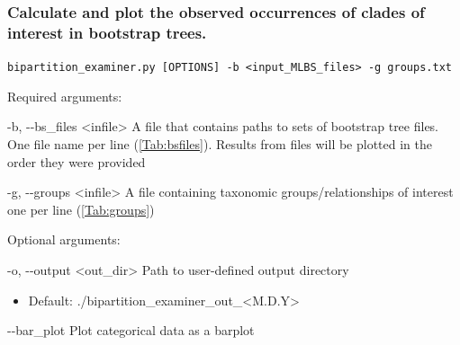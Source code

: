 \documentclass{article}
\def\code#1{\texttt{#1}}
\begin{document}
        \subsubsection{Calculate and plot the observed occurrences of clades of interest in bootstrap trees.}
        \begin{description}
            

            \vspace{0.2cm}
            \item \code{bipartition\_examiner.py [OPTIONS] -b <input\_MLBS\_files> -g groups.txt}
            \vspace{0.2cm}
            
            \begin{description}
                \item Required arguments:
                \begin{description}
                    \item -b, -\/-bs\_files \hspace{0.2cm} <infile> \hspace{0.2cm} A file that contains paths to sets of bootstrap tree files. One file name per line (\autoref{Tab:bsfiles}). Results from files will be plotted in the order they were provided
                    \item -g, -\/-groups \hspace{0.2cm} <infile> \hspace{0.2cm} A file containing taxonomic groups/relationships of interest one per line (\autoref{Tab:groups})
                \end{description}
            \end{description}
            \vspace{0.2cm}
            \begin{description}
                \item Optional arguments:
                \begin{description}
                    \item -o, -\/-output \hspace{0.2cm} <out\_dir> \hspace{0.2cm} Path to user-defined output directory
                    \begin{itemize}
                        \item Default: ./bipartition\_examiner\_out\_<M.D.Y>
                    \end{itemize}
                    \item -\/-bar\_plot \hspace{0.2cm} Plot categorical data as a barplot

\end{description}
\end{description}
\end{description}
\end{document}
